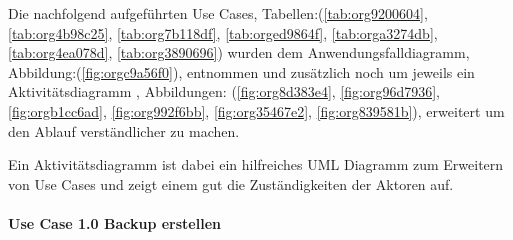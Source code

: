 Die nachfolgend aufgeführten Use Cases, Tabellen:(\ref{tab:org9200604}, \ref{tab:org4b98c25},
\ref{tab:org7b118df}, \ref{tab:orged9864f}, \ref{tab:orga3274db}, \ref{tab:org4ea078d}, \ref{tab:org3890696})
wurden dem Anwendungsfalldiagramm, Abbildung:(\ref{fig:orgc9a56f0}), entnommen und
zusätzlich noch um jeweils ein Aktivitätsdiagramm , Abbildungen:
(\ref{fig:org8d383e4}, \ref{fig:org96d7936}, \ref{fig:orgb1cc6ad},
\ref{fig:org992f6bb}, \ref{fig:org35467e2}, \ref{fig:org839581b}), erweitert
um den Ablauf verständlicher zu machen.

Ein Aktivitätsdiagramm ist dabei ein hilfreiches UML Diagramm zum Erweitern von
Use Cases und zeigt einem gut die Zuständigkeiten der Aktoren auf.

\paragraph{Use Case 1.0 Backup erstellen}
\label{sec:org9166a09}

